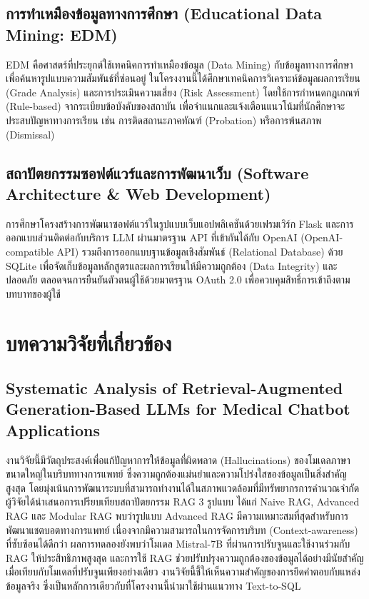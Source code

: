\subsection{การทำเหมืองข้อมูลทางการศึกษา (Educational Data Mining: EDM)}

EDM คือศาสตร์ที่ประยุกต์ใช้เทคนิคการทำเหมืองข้อมูล (Data Mining) กับข้อมูลทางการศึกษา เพื่อค้นหารูปแบบความสัมพันธ์ที่ซ่อนอยู่ ในโครงงานนี้ได้ศึกษาเทคนิคการวิเคราะห์ข้อมูลผลการเรียน (Grade Analysis) และการประเมินความเสี่ยง (Risk Assessment) โดยใช้การกำหนดกฎเกณฑ์ (Rule-based) จากระเบียบข้อบังคับของสถาบัน เพื่อจำแนกและแจ้งเตือนแนวโน้มที่นักศึกษาจะประสบปัญหาทางการเรียน เช่น การติดสถานะภาคทัณฑ์ (Probation) หรือการพ้นสภาพ (Dismissal)

\subsection{สถาปัตยกรรมซอฟต์แวร์และการพัฒนาเว็บ (Software Architecture \& Web Development)}

การศึกษาโครงสร้างการพัฒนาซอฟต์แวร์ในรูปแบบเว็บแอปพลิเคชันด้วยเฟรมเวิร์ก Flask และการออกแบบส่วนติดต่อกับบริการ LLM ผ่านมาตรฐาน API ที่เข้ากันได้กับ OpenAI (OpenAI-compatible API) รวมถึงการออกแบบฐานข้อมูลเชิงสัมพันธ์ (Relational Database) ด้วย SQLite เพื่อจัดเก็บข้อมูลหลักสูตรและผลการเรียนให้มีความถูกต้อง (Data Integrity) และปลอดภัย ตลอดจนการยืนยันตัวตนผู้ใช้ด้วยมาตรฐาน OAuth 2.0 เพื่อควบคุมสิทธิ์การเข้าถึงตามบทบาทของผู้ใช้

\section{บทความวิจัยที่เกี่ยวข้อง}

\subsection{Systematic Analysis of Retrieval-Augmented Generation-Based LLMs for Medical Chatbot Applications \cite{medicalRAG}}

งานวิจัยนี้มีวัตถุประสงค์เพื่อแก้ปัญหาการให้ข้อมูลที่ผิดพลาด (Hallucinations) ของโมเดลภาษาขนาดใหญ่ในบริบททางการแพทย์ ซึ่งความถูกต้องแม่นยำและความโปร่งใสของข้อมูลเป็นสิ่งสำคัญสูงสุด โดยมุ่งเน้นการพัฒนาระบบที่สามารถทำงานได้ในสภาพแวดล้อมที่มีทรัพยากรการคำนวณจำกัด ผู้วิจัยได้นำเสนอการเปรียบเทียบสถาปัตยกรรม RAG 3 รูปแบบ ได้แก่ Naive RAG, Advanced RAG และ Modular RAG พบว่ารูปแบบ Advanced RAG มีความเหมาะสมที่สุดสำหรับการพัฒนาแชตบอตทางการแพทย์ เนื่องจากมีความสามารถในการจัดการบริบท (Context-awareness) ที่ซับซ้อนได้ดีกว่า ผลการทดลองยังพบว่าโมเดล Mistral-7B ที่ผ่านการปรับจูนและใช้งานร่วมกับ RAG ให้ประสิทธิภาพสูงสุด และการใช้ RAG ช่วยปรับปรุงความถูกต้องของข้อมูลได้อย่างมีนัยสำคัญเมื่อเทียบกับโมเดลที่ปรับจูนเพียงอย่างเดียว งานวิจัยนี้ชี้ให้เห็นความสำคัญของการยึดคำตอบกับแหล่งข้อมูลจริง ซึ่งเป็นหลักการเดียวกับที่โครงงานนี้นำมาใช้ผ่านแนวทาง Text-to-SQL

